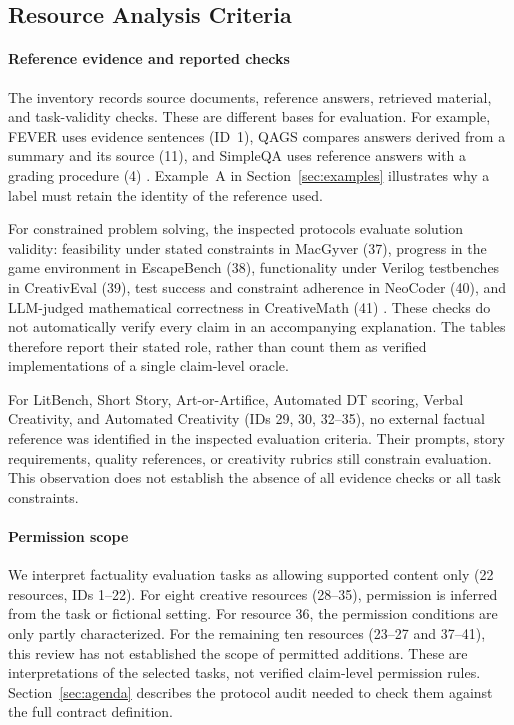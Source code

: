 \subsection{Resource Analysis Criteria}\label{sec:mapping}

\paragraph{Reference evidence and reported checks}
The inventory records source documents, reference answers, retrieved
material, and task-validity checks. These are different bases for evaluation.
For example, FEVER uses evidence sentences (ID~1), QAGS compares answers
derived from a summary and its source (11), and SimpleQA uses reference
answers with a grading procedure (4)
\citep{thorne_fever_2018,wang_asking_2020,wei_measuring_2024}.
Example~A in Section~\ref{sec:examples} illustrates why a label must retain the
identity of the reference used.

For constrained problem solving, the inspected protocols evaluate solution
validity: feasibility under stated constraints in MacGyver (37), progress
in the game environment in EscapeBench (38), functionality under Verilog
testbenches in CreativEval (39), test success and constraint adherence in
NeoCoder (40), and LLM-judged mathematical correctness in CreativeMath (41)
\citep{tian_macgyver_2025,qian_escapebench_2025,delorenzo_creativeval_2024,
lu_benchmarking_2025,ye_assessing_2025}. These checks do not automatically
verify every claim in an accompanying explanation. The tables therefore
report their stated role, rather than count them as verified implementations
of a single claim-level oracle.

For LitBench, Short Story, Art-or-Artifice, Automated DT scoring, Verbal
Creativity, and Automated Creativity (IDs 29, 30, 32--35), no external
factual reference was identified in the inspected evaluation criteria.
Their prompts, story requirements, quality references, or creativity
rubrics still constrain evaluation. This observation does not establish
the absence of all evidence checks or all task constraints.

\paragraph{Permission scope}
We interpret factuality evaluation tasks as allowing supported content
only (22 resources, IDs 1--22). For eight creative resources (28--35),
permission is inferred from the task or fictional setting. For resource 36,
the permission conditions are only partly characterized. For the remaining
ten resources (23--27 and 37--41), this review has not established the scope
of permitted additions. These are interpretations of the selected tasks,
not verified claim-level permission rules. Section~\ref{sec:agenda}
describes the protocol audit needed to check them against the full
contract definition.

